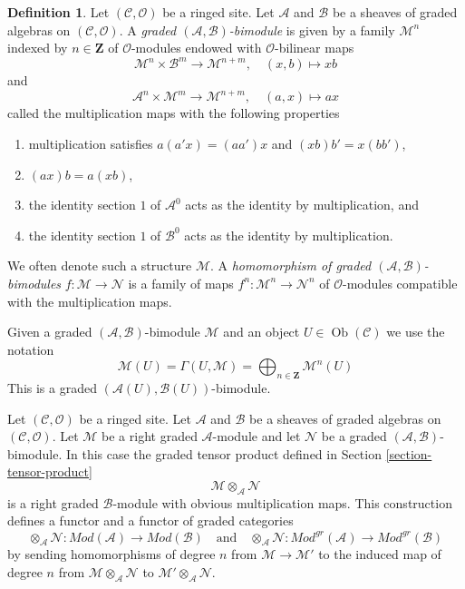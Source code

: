 \documentclass{stacks-project}
\theoremstyle{plain}
\theoremstyle{definition}
\newtheorem{definition}[subsection]{Definition}
\theoremstyle{remark}
\numberwithin{equation}{subsection}
\def\Ob{\mathop{\mathrm{Ob}}\nolimits}
\begin{document}
\begin{definition}
\label{definition-bimodule}
Let $(\mathcal{C}, \mathcal{O})$ be a ringed site. Let $\mathcal{A}$
and $\mathcal{B}$ be a sheaves of graded algebras on
$(\mathcal{C}, \mathcal{O})$. A
{\it graded $(\mathcal{A}, \mathcal{B})$-bimodule}
is given by a family $\mathcal{M}^n$ indexed by $n \in \mathbf{Z}$
of $\mathcal{O}$-modules endowed with $\mathcal{O}$-bilinear maps
$$
\mathcal{M}^n \times \mathcal{B}^m \to \mathcal{M}^{n + m},\quad
(x, b) \longmapsto xb
$$
and
$$
\mathcal{A}^n \times \mathcal{M}^m \to \mathcal{M}^{n + m},\quad
(a, x) \longmapsto ax
$$
called the multiplication maps with the following properties
\begin{enumerate}
\item multiplication satisfies $a(a'x) = (aa')x$ and
$(xb)b' = x(bb')$,
\item $(ax)b = a(xb)$,
\item the identity section $1$ of $\mathcal{A}^0$ acts as the
identity by multiplication, and
\item the identity section $1$ of
$\mathcal{B}^0$ acts as the identity by multiplication.
\end{enumerate}
We often denote such a structure $\mathcal{M}$.
A {\it homomorphism of graded $(\mathcal{A}, \mathcal{B})$-bimodules}
$f : \mathcal{M} \to \mathcal{N}$ is a family of maps
$f^n : \mathcal{M}^n \to \mathcal{N}^n$
of $\mathcal{O}$-modules compatible with the multiplication maps.
\end{definition}

\noindent
Given a graded $(\mathcal{A}, \mathcal{B})$-bimodule $\mathcal{M}$
and an object $U \in \Ob(\mathcal{C})$ we use the notation
$$
\mathcal{M}(U) =
\Gamma(U, \mathcal{M}) =
\bigoplus\nolimits_{n \in \mathbf{Z}} \mathcal{M}^n(U)
$$
This is a graded $(\mathcal{A}(U), \mathcal{B}(U))$-bimodule.

\medskip\noindent
Let $(\mathcal{C}, \mathcal{O})$ be a ringed site. Let $\mathcal{A}$
and $\mathcal{B}$ be a sheaves of graded algebras on
$(\mathcal{C}, \mathcal{O})$. Let $\mathcal{M}$ be a right
graded $\mathcal{A}$-module and let $\mathcal{N}$ be a
graded $(\mathcal{A}, \mathcal{B})$-bimodule. In this case the
graded tensor product defined in Section \ref{section-tensor-product}
$$
\mathcal{M} \otimes_\mathcal{A} \mathcal{N}
$$
is a right graded $\mathcal{B}$-module with obvious multiplication maps.
This construction defines a functor and a functor of graded categories
$$
\otimes_\mathcal{A} \mathcal{N} :
\textit{Mod}(\mathcal{A})
\longrightarrow
\textit{Mod}(\mathcal{B})
\quad\text{and}\quad
\otimes_\mathcal{A} \mathcal{N} :
\textit{Mod}^{gr}(\mathcal{A})
\longrightarrow
\textit{Mod}^{gr}(\mathcal{B})
$$
by sending homomorphisms of degree $n$ from $\mathcal{M} \to \mathcal{M}'$
to the induced map of degree $n$ from
$\mathcal{M} \otimes_\mathcal{A} \mathcal{N}$ to
$\mathcal{M}' \otimes_\mathcal{A} \mathcal{N}$.
\end{document}
